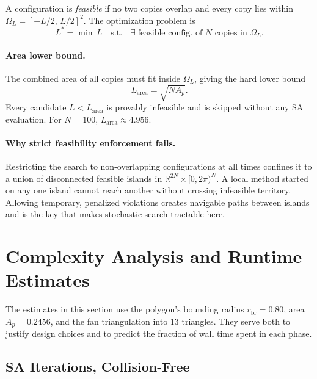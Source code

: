 \documentclass[10pt,twocolumn]{article}
\begin{document}
A configuration is \emph{feasible} if no two copies overlap and every
copy lies within $\Omega_L = [-L/2,\,L/2]^2$. The optimization problem is
\begin{equation}
  L^* = \min\, L \quad \text{s.t.} \quad \exists\;
  \text{feasible config.\ of } N \text{ copies in } \Omega_L.
  \label{eq:opt}
\end{equation}

\paragraph{Area lower bound.}
The combined area of all copies must fit inside $\Omega_L$, giving the
hard lower bound
\begin{equation}
  L_{\mathrm{area}} = \sqrt{N A_p}.
  \label{eq:area_bound}
\end{equation}
Every candidate $L < L_{\mathrm{area}}$ is provably infeasible and is
skipped without any SA evaluation. For $N = 100$,
$L_{\mathrm{area}} \approx 4.956$.

\paragraph{Why strict feasibility enforcement fails.}
Restricting the search to non-overlapping configurations at all times
confines it to a union of disconnected feasible islands in
$\mathbb{R}^{2N} \times [0,2\pi)^N$. A local method started on any
one island cannot reach another without crossing infeasible territory.
Allowing temporary, penalized violations creates navigable paths between
islands and is the key that makes stochastic search tractable here.

\section{Complexity Analysis and Runtime Estimates}
\label{sec:complexity}

The estimates in this section use the polygon's bounding radius
$r_{\mathrm{br}} = 0.80$, area $A_p = 0.2456$, and the fan
triangulation into 13 triangles. They serve both to justify design
choices and to predict the fraction of wall time spent in each phase.

\subsection{SA Iterations, Collision-Free}
\end{document}
